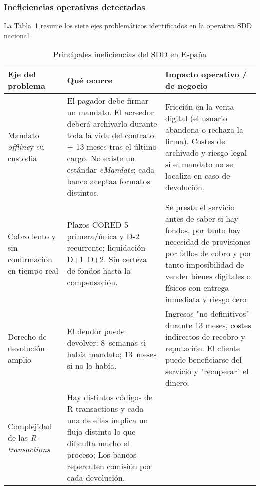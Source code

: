 \subsubsection{Ineficiencias operativas detectadas}

La Tabla~\ref{tab:ineficiencias_sdd} resume los siete ejes problemáticos identificados en la operativa SDD nacional.

\clearpage

\begin{table}[hbt]
  \footnotesize
  \caption{Principales ineficiencias del SDD en España}
  \label{tab:ineficiencias_sdd}
  \centering
  \begin{tabularx}{\textwidth}{
     >{\raggedright\arraybackslash}p{2.9cm}
     X
     >{\raggedright\arraybackslash}p{3.7cm}
  }
    \toprule
    \textbf{Eje del problema} 
      & \textbf{Qué ocurre}
      & \textbf{Impacto operativo / de negocio} \\
    \midrule
    Mandato \emph{offline}\footnotemark y su custodia
      & El pagador debe firmar un mandato. El acreedor deberá archivarlo durante toda la vida del contrato + 13 meses tras el último cargo. No existe un estándar \emph{eMandate}\footnotemark; cada banco aceptaa formatos distintos. 
      & Fricción en la venta digital (el usuario abandona o rechaza la firma). Costes de archivado y riesgo legal si el mandato no se localiza en caso de devolución. \\
    \addlinespace
    Cobro lento y sin confirmación en tiempo real
      & Plazos CORE\footnotemark D-5 primera/única y D-2 recurrente; liquidación D+1–D+2. Sin certeza de fondos hasta la compensación.
      & Se presta el servicio antes de saber si hay fondos, por tanto hay necesidad de provisiones por fallos de cobro y por tanto imposibilidad de vender bienes digitales o físicos con entrega inmediata y riesgo cero \\
    \addlinespace
    Derecho de devolución amplio
      & El deudor puede devolver: 8~semanas si había mandato; 13~meses si no lo había.
      & Ingresos "no definitivos" durante 13 meses, costes indirectos de recobro y reputación. El cliente puede beneficiarse del servicio y "recuperar" el dinero. \\
    \addlinespace
    Complejidad de las \emph{R-transactions}\footnotemark
      & Hay distintos códigos de R-transactions y cada una de ellas implica un flujo distinto lo que dificulta mucho el proceso; Los bancos repercuten comisión por cada devolución.

\end{tabularx}
\end{table}
